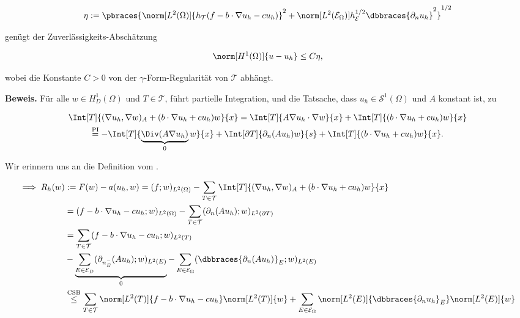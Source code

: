 \begin{solution}
\begin{enumerate}[label = \textbf{\alph*)}]
\begin{tcolorbox}[standard jigsaw, opacityback = 0]
    \begin{align*}
      \eta
      :=
      \pbraces
      {
        \norm[L^2(\Omega)]{h_\mathcal{T} (f - b \cdot \nabla u_h - c u_h)}^2
        +
        \norm[L^2(\mathcal{E}_\Omega)]{h_\mathcal{E}^{1/2} \dbbraces{\partial_n u_h}}^2
      }^{1/2}
    \end{align*}

    genügt der Zuverlässigkeits-Abschätzung

    \begin{align*}
      \norm[H^1(\Omega)]{u - u_h}
      \leq
      C \eta,
    \end{align*}

    wobei die Konstante $C > 0$ von der $\gamma$-Form-Regularität von $\mathcal{T}$ abhängt.

  \end{tcolorbox}

  \textbf{Beweis.}
  Für alle $w \in H_D^1(\Omega)$ und $T \in \mathcal{T}$, führt partielle Integration, und die Tatsache, dass $u_h \in \mathcal{S}^1(\Omega)$ und $A$ konstant ist, zu

  \begin{multline*}
    \Int[T]{(\nabla u_h, \nabla w)_A + (b \cdot \nabla u_h + c u_h) w}{x}
    =
    \Int[T]{A \nabla u_h \cdot \nabla w}{x}
    +
    \Int[T]{(b \cdot \nabla u_h + c u_h) w}{x} \\
    \stackrel
    {
      \mathrm{PI}
    }{=}
    -\Int[T]
    {
      \underbrace
      {
        \Div(A \nabla u_h)
      }_0
      w
    }{x}
    +
    \Int[\partial T]{\partial_n(A u_h) w}{s}
    +
    \Int[T]{(b \cdot \nabla u_h + c u_h) w}{x}.
  \end{multline*}

  Wir erinnern uns an die Definition vom .


  \begin{align*}
    \implies
    R_h(w)
    & :=
    F(w) - a(u_h, w)
    =
    (f; w)_{L^2(\Omega)}
    -
    \sum_{T \in \mathcal{T}}
    \Int[T]{(\nabla u_h, \nabla w)_A + (b \cdot \nabla u_h + c u_h) w}{x} \\
    & =
    (f - b \cdot \nabla u_h - c u_h; w)_{L^2(\Omega)}
    -
    \sum_{T \in \mathcal{T}}
    (\partial_n (A u_h); w)_{L^2(\partial T)} \\
    & =
    \sum_{T \in \mathcal{T}}
    (f - b \cdot \nabla u_h - c u_h; w)_{L^2(T)} \\
    & -
    \underbrace
    {
      \sum_{E \in \mathcal{E}_D}
      (\partial_{n_E^-} (A u_h); w)_{L^2(E)}
    }_0
    -
    \sum_{E \in \mathcal{E}_\Omega}
    (\dbbraces{\partial_n (A u_h)}_E; w)_{L^2(E)} \\
    & \stackrel
    {
      \mathrm{CSB}
    }{\leq}
    \sum_{T \in \mathcal{T}}
    \norm[L^2(T)]{f - b \cdot \nabla u_h - c u_h}
    \norm[L^2(T)]{w}
    +
    \sum_{E \in \mathcal{E}_\Omega}
    \norm[L^2(E)]{\dbbraces{\partial_n u_h}_E}
    \norm[L^2(E)]{w}
  \end{align*}


\end{enumerate}
\end{solution}

